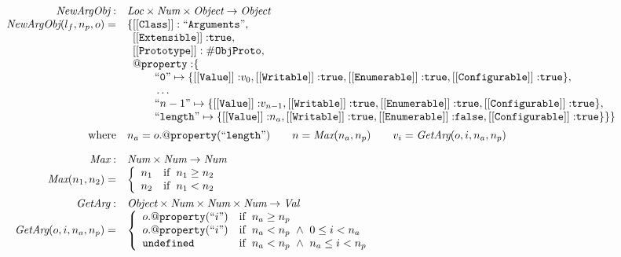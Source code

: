 \documentclass[a4paper, leqno]{amsart}
\newcommand{\rulesep}{\quad\quad}
\newcommand{\undef}{{\tt undefined}}
\newcommand{\false}{{\tt false}}
\newcommand{\true}{{\tt true}}
\newcommand{\Val}{\emph{Val}}
\newcommand{\Loc}{\emph{Loc}}
\newcommand{\Obj}{\emph{Object}}
\newcommand{\Num}{\emph{Num}}
\newcommand{\hf}[1]{\emph{#1}}
\newcommand{\ifc}[1]{{\rm if}\begin{array}[t]{l}#1\end{array}}
\begin{document}
\[\begin{array}{rl}
\hf{NewArgObj} :& \Loc \times \Num \times \Obj \rightarrow \Obj \\
\hf{NewArgObj}(l_f, n_p, o) =&
{\tt \{[[Class]]: ``Arguments"}, \\%
& \phantom{\{}
{\tt [[Extensible]]:} \true,\\
& \phantom{\{}{\tt [[Prototype]]: \#ObjProto}, \\
& \phantom{\{}{\tt @property:} \{\\
& \phantom{\{\qquad}
{\tt``0"} \mapsto\{{\tt [[Value]]:}v_0,%
{\tt [[Writable]]:} \true,
{\tt [[Enumerable]]:} \true,
{\tt [[Configurable]]:} \true\},\\ %
& \phantom{\{\qquad}
\ldots
\\
& \phantom{\{\qquad}
{``n-1"} \mapsto\{{\tt [[Value]]:}v_{n-1},%
{\tt [[Writable]]:} \true,
{\tt [[Enumerable]]:} \true,
{\tt [[Configurable]]:} \true\},\\ %
& \phantom{\{\qquad}
{\tt``length"}\mapsto  %
\{{\tt [[Value]]:}n_a,%
{\tt [[Writable]]:} \true,
{\tt [[Enumerable]]:} \false,
{\tt [[Configurable]]:} \true\}
\}\}
\\[.5em]
\mbox{where} &
n_a = o.{\tt@property(``length")} %
\rulesep
n = \hf{Max}(n_a, n_p)
\rulesep
v_i = \hf{GetArg}(o, i, n_a, n_p)
\\[1em]

\hf{Max} :& \Num \times \Num \rightarrow \Num\\
\hf{Max}(n_1, n_2) =&
\left\{\begin{array}{ll}
n_1 &\ifc{n_1 \ge n_2}\\
n_2 &\ifc{n_1 < n_2}\\
\end{array}\right.
\\[1em]

\hf{GetArg} :& \Obj \times \Num \times \Num \times \Num \rightarrow \Val\\
\hf{GetArg}(o, i, n_a, n_p) =&
\left\{\begin{array}{ll}
o.{\tt@property(``}i{\tt")} %
 &\ifc{n_a \ge n_p}\\
o.{\tt@property(``}i{\tt")} %
 &\ifc{n_a < n_p ~\wedge~ 0 \le i < n_a}\\
\undef &\ifc{n_a < n_p ~\wedge~ n_a \le i < n_p}\\
\end{array}\right.
\\[2em]
\end{array}
\]
\end{document}

